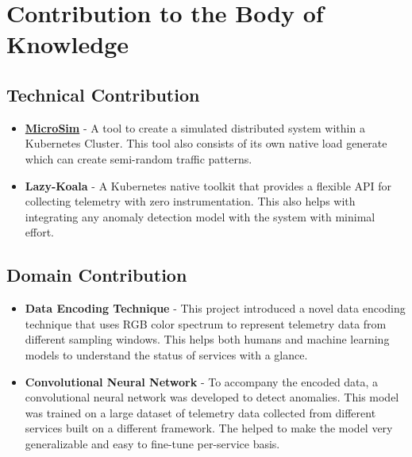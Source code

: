 \section{Contribution to the Body of Knowledge}

\subsection{Technical Contribution}

\begin{itemize}[noitemsep,nolistsep]
    \item \textbf{\href{https://github.com/MrSupiri/MicroSim}{MicroSim}} - A tool to create a simulated distributed system within a Kubernetes Cluster. This tool also consists of its own native load generate which can create semi-random traffic patterns.
    \item \textbf{Lazy-Koala} - A Kubernetes native toolkit that provides a flexible API for collecting telemetry with zero instrumentation. This also helps with integrating any anomaly detection model with the system with minimal effort.
\end{itemize} 

\subsection{Domain Contribution}

\begin{itemize}[noitemsep,nolistsep]
    \item \textbf{Data Encoding Technique} - This project introduced a novel data encoding technique that uses RGB color spectrum to represent telemetry data from different sampling windows. This helps both humans and machine learning models to understand the status of services with a glance.
    \item \textbf{Convolutional Neural Network} - To accompany the encoded data, a convolutional neural network was developed to detect anomalies. This model was trained on a large dataset of telemetry data collected from different services built on a different framework. The helped to make the model very generalizable and easy to fine-tune per-service basis.
\end{itemize} 